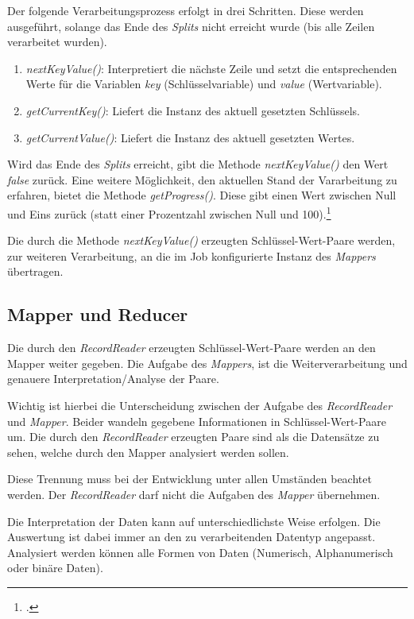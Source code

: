 Der folgende Verarbeitungsprozess erfolgt in drei Schritten. Diese werden ausgeführt, solange das Ende des \textit{Splits} nicht erreicht wurde (bis alle Zeilen verarbeitet wurden).

\begin{enumerate}
\item \textit{nextKeyValue()}: Interpretiert die nächste Zeile und setzt die entsprechenden Werte für die Variablen \textit{key} (Schlüsselvariable) und \textit{value} (Wertvariable).
\item \textit{getCurrentKey()}: Liefert die Instanz des aktuell gesetzten Schlüssels.
\item \textit{getCurrentValue()}: Liefert die Instanz des aktuell gesetzten Wertes.
\end{enumerate} 

Wird das Ende des \textit{Splits} erreicht, gibt die Methode \textit{nextKeyValue()} den Wert \textit{false} zurück. Eine weitere Möglichkeit, den aktuellen Stand der Vararbeitung zu erfahren, bietet die Methode \textit{getProgress()}. Diese gibt einen Wert zwischen Null und Eins zurück (statt einer Prozentzahl zwischen Null und 100).\footcite[Vgl.][S. 117 f.]{Freiknecht.2014}

Die durch die Methode \textit{nextKeyValue()} erzeugten Schlüssel-Wert-Paare werden, zur weiteren Verarbeitung, an die im Job konfigurierte Instanz des \textit{Mappers} übertragen. 

\subsection{Mapper und Reducer}
Die durch den \textit{RecordReader} erzeugten Schlüssel-Wert-Paare werden an den Mapper weiter gegeben. Die Aufgabe des \textit{Mappers}, ist die Weiterverarbeitung und genauere Interpretation/Analyse der Paare.

Wichtig ist hierbei die Unterscheidung zwischen der Aufgabe des \textit{RecordReader} und \textit{Mapper}. Beider wandeln gegebene Informationen in Schlüssel-Wert-Paare um. Die durch den \textit{RecordReader} erzeugten Paare sind als die Datensätze zu sehen, welche durch den Mapper analysiert werden sollen.

Diese Trennung muss bei der Entwicklung unter allen Umständen beachtet werden. Der \textit{RecordReader} darf nicht die Aufgaben des \textit{Mapper} übernehmen.

Die Interpretation der Daten kann auf unterschiedlichste Weise erfolgen. Die Auswertung ist dabei immer an den zu verarbeitenden Datentyp angepasst. Analysiert werden können alle Formen von Daten (Numerisch, Alphanumerisch oder binäre Daten).


